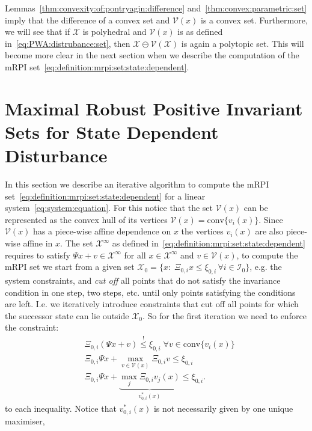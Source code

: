 \documentclass[letterpaper, 10pt, conference]{ieeeconf} %
\providecommand{\conv}{\text{conv}}
\begin{document}
%
%
\def\genmat{\Xi} \def\genvec{\xi}Lemmas~\ref{thm:convexity:of:pontryagin:difference} 
and~\ref{thm:convex:parametric:set} imply that the difference of a convex set and 
$\mathcal V(x)$ is a convex set.
Furthermore, we will see that if $\mathcal X$ is polyhedral and $\mathcal 
V(x)$ is as defined in~\eqref{eq:PWA:distrubance:set}, then $\mathcal X\ominus\mathcal V(\mathcal X)$ is 
again a polytopic set. This will become more clear in the next section when we describe 
the computation of the mRPI set~\eqref{eq:definition:mrpi:set:state:dependent}.
%
%
%
%
\section{Maximal Robust Positive Invariant Sets for State Dependent Disturbance}\label{sec:state:dep:mrpi}
In this section we describe an iterative algorithm to compute the mRPI 
set~\eqref{eq:definition:mrpi:set:state:dependent} for a linear system~\eqref{eq:system:equation}.
For this notice that the set $\mathcal V(x)$ can be represented as the convex hull of its vertices 
$\mathcal V(x) = \conv\{v_i(x)\}$. Since ${\mathcal{V}}(x)$
has a piece-wise affine dependence on $x$ the vertices $v_i(x)$ are also piece-wise affine in $x$.
The set $\mathcal X^\infty$ as defined in~\eqref{eq:definition:mrpi:set:state:dependent} 
requires to satisfy $\Psi x + v\in\mathcal X^\infty$ for all
$x\in\mathcal X^\infty$ and $v\in\mathcal V(x)$, to compute the mRPI set we start from a given set
$\mathcal X_0 = \{x:\;\genmat_{0,i}x\leq \genvec_{0,i}\,\forall i\in\mathcal I_0\}$, e.g.
the system constraints, and 
\emph{cut off} all points that do not satisfy the invariance condition in one step, two steps, 
etc. until only points satisfying the conditions are left. I.e. we iteratively introduce 
constraints that cut off all points for which the successor state can lie outside 
$\mathcal X_0$. So for the first iteration we need to enforce the constraint:
%
\begin{equation}\begin{split}
	&\genmat_{0,i}(\Psi x + v)\overset{!}{\leq}\genvec_{0,i}\;\forall v\in\conv\{v_i(x)\}\\
	&\genmat_{0,i}\Psi x + \max_{v\in\mathcal V(x)} \genmat_{0,i} v \leq \genvec_{0,i}\\
	&\genmat_{0,i}\Psi x + \underbrace{\max_{j} \genmat_{0,i} v_j(x)}_{v_{0,i}^\ast(x)} \leq \genvec_{0,i}.
\end{split}\end{equation}
%
to each inequality.
Notice that $v_{0,i}^\ast(x)$ is not necessarily given by one unique maximiser, 
\end{document}
